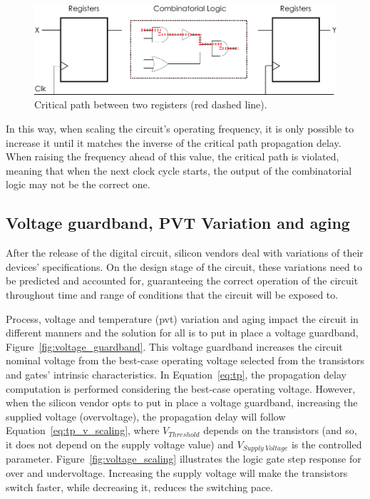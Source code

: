 \begin{figure}[htb]
    \centering
    \includegraphics[width=130mm]{Figures/Background/comb_logic.pdf}
    \caption{Critical path between two registers (red dashed line).}
    \label{fig:critical_path}
\end{figure}

In this way, when scaling the circuit's operating frequency, it is only possible to increase it until it matches the inverse of the critical path propagation delay. When raising the frequency ahead of this value, the critical path is violated, meaning that when the next clock cycle starts, the output of the combinatorial logic may not be the correct one.




\subsection{Voltage guardband, PVT Variation and aging}

After the release of the digital circuit, silicon vendors deal with variations of their devices' specifications. On the design stage of the circuit, these variations need to be predicted and accounted for, guaranteeing the correct operation of the circuit throughout time and range of conditions that the circuit will be exposed to.

Process, voltage and temperature (\acrshort{pvt}) variation and aging impact the circuit in different manners and the solution for all is to put in place a voltage guardband, Figure~\ref{fig:voltage_guardband}. This voltage guardband increases the circuit nominal voltage from the best-case operating voltage selected from the transistors and gates' intrinsic characteristics.
In Equation~\ref{eq:tp}, the propagation delay computation is performed considering the best-case operating voltage. However, when the silicon vendor opts to put in place a voltage guardband, increasing the supplied voltage (overvoltage), the propagation delay will follow Equation~\ref{eq:tp_v_scaling}, where $V_{Threshold}$ depends on the transistors (and so, it does not depend on the supply voltage value) and $V_{Supply \: Voltage}$ is the controlled parameter. Figure~\ref{fig:voltage_scaling} illustrates the logic gate step response for over and undervoltage. Increasing the supply voltage will make the transistors switch faster, while decreasing it, reduces the switching pace.



